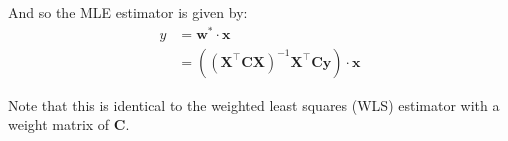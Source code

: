 \documentclass{article}
\renewcommand{\vec}[1]{\mathbf{#1}}
\newcommand{\mat}[1]{\mathbf{#1}}
\DeclareMathOperator*{\argmax}{arg\,max}
\begin{document}
And so the MLE estimator is given by:
\begin{align*}
    y&=\vec w^*\cdot \vec x\\
    &=((\mat X^\top\mat C\mat X)^{-1}\mat X^\top\mat C\vec y)\cdot\vec x
\end{align*}

Note that this is identical to the weighted least squares (WLS) estimator with a weight matrix of $\mat C$.
\smallskip







\end{document}
